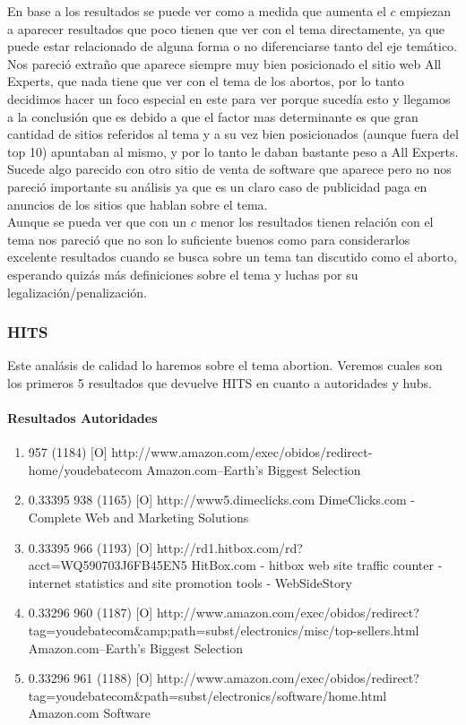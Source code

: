 En base a los resultados se puede ver como a medida que aumenta el $c$ empiezan a aparecer resultados que poco tienen que ver con el tema directamente, ya que puede estar relacionado de alguna forma o no diferenciarse tanto del eje temático.\\
Nos pareció extraño que aparece siempre muy bien posicionado el sitio web All Experts, que nada tiene que ver con el tema de los abortos, por lo tanto decidimos hacer un foco especial en este para ver porque sucedía esto y llegamos a la conclusión que es debido a que el factor mas determinante es que gran cantidad de sitios referidos al tema y a su vez bien posicionados (aunque fuera del top 10) apuntaban al mismo, y por lo tanto le daban bastante peso a All Experts.\\
Sucede algo parecido con otro sitio de venta de software que aparece pero no nos pareció importante su análisis ya que es un claro caso de publicidad paga en anuncios de los sitios que hablan sobre el tema.\\
Aunque se pueda ver que con un $c$ menor los resultados tienen relación con el tema nos pareció que no son lo suficiente buenos como para considerarlos excelente resultados cuando se busca sobre un tema tan discutido como el aborto, esperando quizás más definiciones sobre el tema y luchas por su legalización/penalización. 

\subsubsection{HITS}
Este analásis de calidad lo haremos sobre el tema abortion. Veremos cuales son los primeros 5 resultados que devuelve HITS en cuanto a autoridades y hubs.

\paragraph{Resultados Autoridades}
\begin{enumerate}
\item
957 (1184) [O]
http://www.amazon.com/exec/obidos/redirect-home/youdebatecom
Amazon.com--Earth's Biggest Selection

\item
0.33395
938 (1165) [O]
http://www5.dimeclicks.com
DimeClicks.com - Complete Web and Marketing Solutions

\item
0.33395
966 (1193) [O]
http://rd1.hitbox.com/rd?acct=WQ590703J6FB45EN5
HitBox.com - hitbox web site traffic counter - internet statistics and site promotion tools - WebSideStory

\item
0.33296
960 (1187) [O]
http://www.amazon.com/exec/obidos/redirect?tag=youdebatecom&amp;path=subst/electronics/misc/top-sellers.html
Amazon.com--Earth's Biggest Selection

\item
0.33296
961 (1188) [O]
http://www.amazon.com/exec/obidos/redirect?tag=youdebatecom&path=subst/electronics/software/home.html
Amazon.com Software

\end{enumerate}


